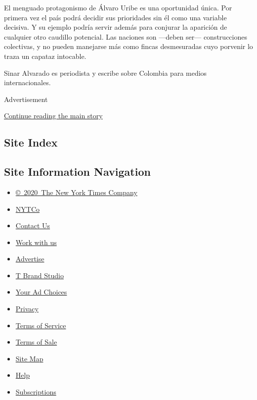 El menguado protagonismo de Álvaro Uribe es una oportunidad única. Por
primera vez el país podrá decidir sus prioridades sin él como una
variable decisiva. Y su ejemplo podría servir además para conjurar la
aparición de cualquier otro caudillo potencial. Las naciones son
---deben ser--- construcciones colectivas, y no pueden manejarse más
como fincas desmesuradas cuyo porvenir lo traza un capataz intocable.

Sinar Alvarado es periodista y escribe sobre Colombia para medios
internacionales.

Advertisement

\protect\hyperlink{after-bottom}{Continue reading the main story}

\hypertarget{site-index}{%
\subsection{Site Index}\label{site-index}}

\hypertarget{site-information-navigation}{%
\subsection{Site Information
Navigation}\label{site-information-navigation}}

\begin{itemize}
\tightlist
\item
  \href{https://help.nytimes3xbfgragh.onion/hc/en-us/articles/115014792127-Copyright-notice}{©~2020~The
  New York Times Company}
\end{itemize}

\begin{itemize}
\tightlist
\item
  \href{https://www.nytco.com/}{NYTCo}
\item
  \href{https://help.nytimes3xbfgragh.onion/hc/en-us/articles/115015385887-Contact-Us}{Contact
  Us}
\item
  \href{https://www.nytco.com/careers/}{Work with us}
\item
  \href{https://nytmediakit.com/}{Advertise}
\item
  \href{http://www.tbrandstudio.com/}{T Brand Studio}
\item
  \href{https://www.nytimes3xbfgragh.onion/privacy/cookie-policy\#how-do-i-manage-trackers}{Your
  Ad Choices}
\item
  \href{https://www.nytimes3xbfgragh.onion/privacy}{Privacy}
\item
  \href{https://help.nytimes3xbfgragh.onion/hc/en-us/articles/115014893428-Terms-of-service}{Terms
  of Service}
\item
  \href{https://help.nytimes3xbfgragh.onion/hc/en-us/articles/115014893968-Terms-of-sale}{Terms
  of Sale}
\item
  \href{https://spiderbites.nytimes3xbfgragh.onion}{Site Map}
\item
  \href{https://help.nytimes3xbfgragh.onion/hc/en-us}{Help}
\item
  \href{https://www.nytimes3xbfgragh.onion/subscription?campaignId=37WXW}{Subscriptions}
\end{itemize}
